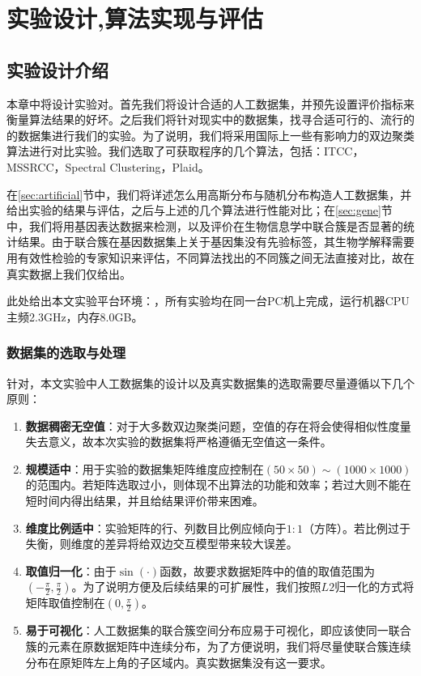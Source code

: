 
\chapter{实验设计,算法实现与评估}
\label{chapter:experiment}
\section{实验设计介绍}
\label{sec:experiment}
本章中将设计实验对。首先我们将设计合适的人工数据集，并预先设置评价指标来衡量算法结果的好坏。之后我们将针对现实中的数据集，找寻合适可行的、流行的的数据集进行我们的实验。为了说明，我们将采用国际上一些有影响力的双边聚类算法进行对比实验。我们选取了可获取程序的几个算法，包括：ITCC\cite{dhillon2003information}，MSSRCC\cite{cho2008coclustering}，Spectral Clustering\cite{kluger2003spectral}，Plaid\cite{lazzeroni2002plaid}。

在\ref{sec:artificial}节中，我们将详述怎么用高斯分布与随机分布构造人工数据集，并给出实验的结果与评估，之后与上述的几个算法进行性能对比；在\ref{sec:gene}节中，我们将用基因表达数据来检测，以及评价在生物信息学中联合簇是否显著的统计结果。由于联合簇在基因数据集上关于基因集没有先验标签，其生物学解释需要用有效性检验的专家知识来评估，不同算法找出的不同簇之间无法直接对比，故在真实数据上我们仅给出。

此处给出本文实验平台环境：，所有实验均在同一台PC机上完成，运行机器CPU主频2.3GHz，内存8.0GB。

\subsection{数据集的选取与处理}
\label{subsec:principle}
针对，本文实验中人工数据集的设计以及真实数据集的选取需要尽量遵循以下几个原则：
\begin{enumerate}
\item \textbf{数据稠密无空值}：对于大多数双边聚类问题，空值的存在将会使得相似性度量失去意义，故本次实验的数据集将严格遵循无空值这一条件。
\item \textbf{规模适中}：用于实验的数据集矩阵维度应控制在$(50\times50)\sim(1000\times1000)$的范围内。若矩阵选取过小，则体现不出算法的功能和效率；若过大则不能在短时间内得出结果，并且给结果评价带来困难。
\item \textbf{维度比例适中}：实验矩阵的行、列数目比例应倾向于$1:1$（方阵）。若比例过于失衡，则维度的差异将给双边交互模型带来较大误差。
\item \textbf{取值归一化}：由于$\sin(\cdot)$函数，故要求数据矩阵中的值的取值范围为$(-\frac{\pi}{2},\frac{\pi}{2})$。为了说明方便及后续结果的可扩展性，我们按照$L2$归一化的方式将矩阵取值控制在$(0,\frac{\pi}{2})$。
\item \textbf{易于可视化}：人工数据集的联合簇空间分布应易于可视化，即应该使同一联合簇的元素在原数据矩阵中连续分布，为了方便说明，我们将尽量使联合簇连续分布在原矩阵左上角的子区域内。真实数据集没有这一要求。
\end{enumerate}


